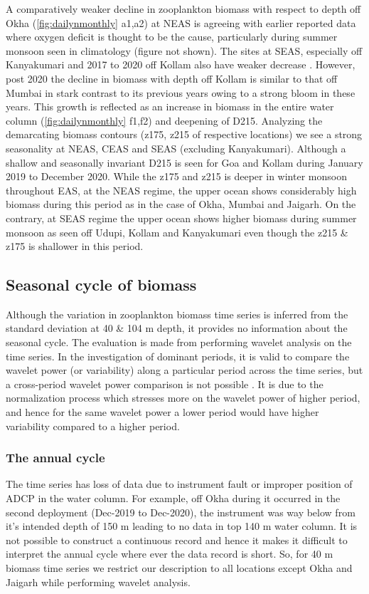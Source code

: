 \documentclass{article}
\begin{document}
	A comparatively weaker decline in zooplankton biomass with respect to depth off Okha (\cref{fig:dailynmonthly} a1,a2) at NEAS is agreeing with earlier reported data \citep{wishner1998mesozooplankton,madhupratap2001mesozooplankton,smith2005mesozooplankton,jyothibabu2010re} where oxygen deficit is thought to be the cause, particularly during summer monsoon seen in \citet{garcia2013oxygen} climatology (figure not shown). The sites at SEAS, especially off Kanyakumari and 2017 to 2020 off Kollam also have weaker decrease \citep{madhupratap2001mesozooplankton, aparna2022seasonal}. However, post 2020 the decline in biomass with depth off Kollam is similar to that off Mumbai in stark contrast to its previous years owing to a strong bloom in these years. This growth is reflected as an increase in biomass in the entire water column (\cref{fig:dailynmonthly} f1,f2) and deepening of D215. Analyzing the demarcating biomass contours (z175, z215 of respective locations) we see a strong seasonality at NEAS, CEAS and SEAS (excluding Kanyakumari). Although a shallow and seasonally invariant D215 is seen for Goa and Kollam  during January 2019 to December 2020. While the z175 and z215 is deeper in winter monsoon throughout EAS, at the NEAS regime, the upper ocean shows considerably high biomass during this period as in the case of Okha, Mumbai and Jaigarh. On the contrary, at SEAS regime the upper ocean shows higher biomass during summer monsoon as seen off Udupi, Kollam and Kanyakumari even though the z215 \& z175 is shallower in this period. 
	
	\subsection{Seasonal cycle of biomass}
	\label{sec:seasonalcyclebiomass}
	Although the variation in zooplankton biomass time series is inferred from the standard deviation at 40 \& 104 m depth, it provides no information about the seasonal cycle. The evaluation is made from performing wavelet analysis on the time series. In the investigation of dominant periods, it is valid to compare the wavelet power (or variability) along a particular period across the time series, but a cross-period wavelet power comparison is not possible \citep{maraun2004cross,chaudhuri2020observed}. It is due to the normalization process which stresses more on the wavelet power of higher period, and hence for the same wavelet power a lower period would have higher variability compared to a higher period. 
	\subsubsection{The annual cycle}
	The time series has loss of data due to instrument fault or improper position of ADCP in the water column. For example, off Okha during it occurred in the second deployment (Dec-2019 to Dec-2020), the instrument was way below from it's intended depth of 150 m leading to no data in top 140 m water column. It is not possible to construct a continuous record and hence it makes it difficult to interpret the annual cycle where ever the data record is short. So, for 40 m biomass time series we restrict our description to all locations except Okha and Jaigarh while performing wavelet analysis.
	
\end{document}
